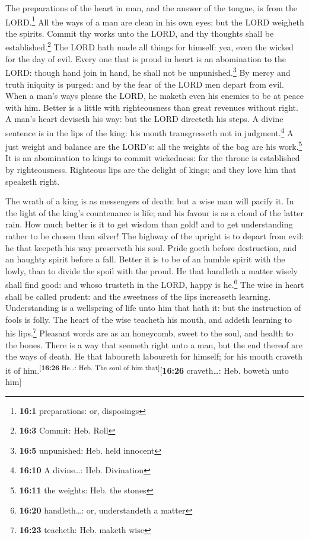 The preparations of the heart in man, and the answer of
the tongue, is from the LORD.\footnote{\textbf{16:1} preparations: or,
  disposings}  All the ways of a man are clean in his own
eyes; but the LORD weigheth the spirits.  Commit thy works
unto the LORD, and thy thoughts shall be established.\footnote{\textbf{16:3}
  Commit: Heb. Roll}  The LORD hath made all things for
himself: yea, even the wicked for the day of evil.  Every
one that is proud in heart is an abomination to the LORD: though hand
join in hand, he shall not be unpunished.\footnote{\textbf{16:5}
  unpunished: Heb. held innocent}  By mercy and truth
iniquity is purged: and by the fear of the LORD men depart from evil.
 When a man's ways please the LORD, he maketh even his
enemies to be at peace with him.  Better is a little with
righteousness than great revenues without right.  A man's
heart deviseth his way: but the LORD directeth his steps.
 A divine sentence is in the lips of the king: his mouth
transgresseth not in judgment.\footnote{\textbf{16:10} A divine\ldots:
  Heb. Divination}  A just weight and balance are the
LORD's: all the weights of the bag are his work.\footnote{\textbf{16:11}
  the weights: Heb. the stones}  It is an abomination to
kings to commit wickedness: for the throne is established by
righteousness.  Righteous lips are the delight of kings;
and they love him that speaketh right.

 The wrath of a king is as messengers of death: but a
wise man will pacify it.  In the light of the king's
countenance is life; and his favour is as a cloud of the latter rain.
 How much better is it to get wisdom than gold! and to
get understanding rather to be chosen than silver!  The
highway of the upright is to depart from evil: he that keepeth his way
preserveth his soul.  Pride goeth before destruction, and
an haughty spirit before a fall.  Better it is to be of
an humble spirit with the lowly, than to divide the spoil with the
proud.  He that handleth a matter wisely shall find good:
and whoso trusteth in the LORD, happy is he.\footnote{\textbf{16:20}
  handleth\ldots: or, understandeth a matter}  The wise
in heart shall be called prudent: and the sweetness of the lips
increaseth learning.  Understanding is a wellspring of
life unto him that hath it: but the instruction of fools is folly.
 The heart of the wise teacheth his mouth, and addeth
learning to his lips.\footnote{\textbf{16:23} teacheth: Heb. maketh wise}
 Pleasant words are as an honeycomb, sweet to the soul,
and health to the bones.  There is a way that seemeth
right unto a man, but the end thereof are the ways of death.
 He that laboureth laboureth for himself; for his mouth
craveth it of him.\textsuperscript{{[}\textbf{16:26} He\ldots: Heb. The
soul of him that{]}}{[}\textbf{16:26} craveth\ldots: Heb. boweth unto
him{]}

